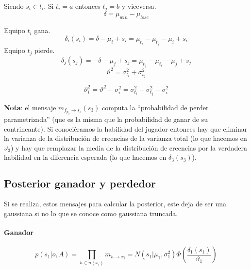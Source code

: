 \documentclass[11pt,twoside,spanish]{report} %
\begin{document}
Siendo $s_i \in t_i$. Si $t_i = a$ entonces $t_j=b$ y viceversa.
\begin{equation}
	\delta = \mu_{win} - \mu_{lose}
\end{equation}

Equipo $t_i$ gana.
\begin{equation}
	\delta_i(s_i) = \delta -\mu_i+s_i =\mu_{t_i} - \mu_{t_j}-\mu_i+s_i
\end{equation}
Equipo $t_j$ pierde.
\begin{equation}
	\delta_j(s_j) = -\delta -\mu_j+s_j = \mu_{t_j}-\mu_{t_i}-\mu_j+s_j
\end{equation}
\begin{equation}
	\vartheta^2 = \sigma_{t_i}^2 + \sigma_{t_j}^2
\end{equation}

\begin{equation}
	\vartheta_i^2 = \vartheta^2 - \sigma_i^2 = \sigma_{t_i}^2 + \sigma_{t_j}^2 - \sigma_i^2
\end{equation}


\textbf{Nota}: el mensaje $m_{f_{p_3} \rightarrow s_3}(s_3)$ computa la ``probabilidad de perder parametrizada'' (que es la misma que la probabilidad de ganar de su contrincante). Si conoci\'eramos la habilidad del jugador entonces hay que eliminar la varianza de la distribuci\'on de creencias de la varianza total (lo que hacemos en $\vartheta_3$) y hay que remplazar la media de la distribuci\'on de creencias por la verdadera habilidad en la diferencia esperada (lo que hacemos en $\delta_3(s_3)$).







\subsection{Posterior ganador y perdedor}
\label{appendix:trunc}
Si se realiza, estos mensajes para calcular la posterior, este deja de ser una gaussiana si no lo que se conoce como gaussiana truncada.

\paragraph{Ganador}
\begin{equation}\label{eq:posterior_ganador}
	p(s_1|o,A) = \prod_{h \in n(x_i)} m_{h \rightarrow x_i} =  N(s_1| \mu_1, \sigma_1^2)  \Phi\left(\frac{\delta_1(s_1)}{\vartheta_1}\right)
\end{equation}
\end{document}
